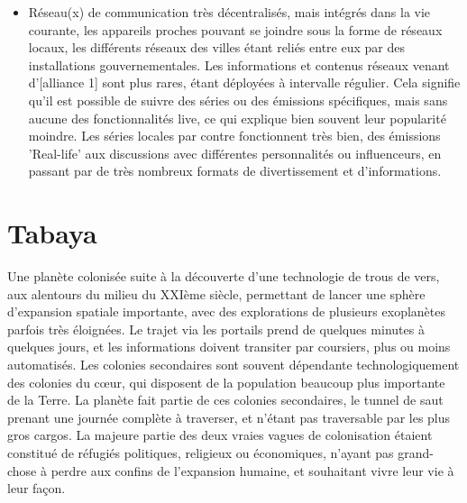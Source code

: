 \documentclass[10pt,a4paper]{book}
\begin{document}
\begin{multicols}{2}
\begin{itemize}
\item Réseau(x) de communication très décentralisés, mais intégrés dans la vie courante, les appareils proches pouvant se joindre sous la forme de réseaux locaux, les différents réseaux des villes étant reliés entre eux par des installations gouvernementales. Les informations et contenus réseaux venant d'[alliance 1] sont plus rares, étant déployées à intervalle régulier. Cela signifie qu'il est possible de suivre des séries ou des émissions spécifiques, mais sans aucune des fonctionnalités live, ce qui explique bien souvent leur popularité moindre. Les séries locales par contre fonctionnent très bien, des émissions 'Real-life' aux discussions avec différentes personnalités ou influenceurs, en passant par de très nombreux formats de divertissement et d'informations.

\end{itemize}
\section{Tabaya}
Une planète colonisée suite à la découverte d'une technologie de trous de vers, aux alentours du milieu du XXIème siècle, permettant de lancer une sphère d'expansion spatiale importante, avec des explorations de plusieurs exoplanètes parfois très éloignées. Le trajet via les portails prend de quelques minutes à quelques jours, et les informations doivent transiter par coursiers, plus ou moins automatisés. Les colonies secondaires sont souvent dépendante technologiquement des colonies du cœur, qui disposent de la population beaucoup plus importante de la Terre.
La planète fait partie de ces colonies secondaires, le tunnel de saut prenant une journée complète à traverser, et n'étant pas traversable par les plus gros cargos. La majeure partie des deux vraies vagues de colonisation étaient constitué de réfugiés politiques, religieux ou économiques, n'ayant pas grand-chose à perdre aux confins de l'expansion humaine, et souhaitant vivre leur vie à leur façon.


\end{multicols}
\end{document}
